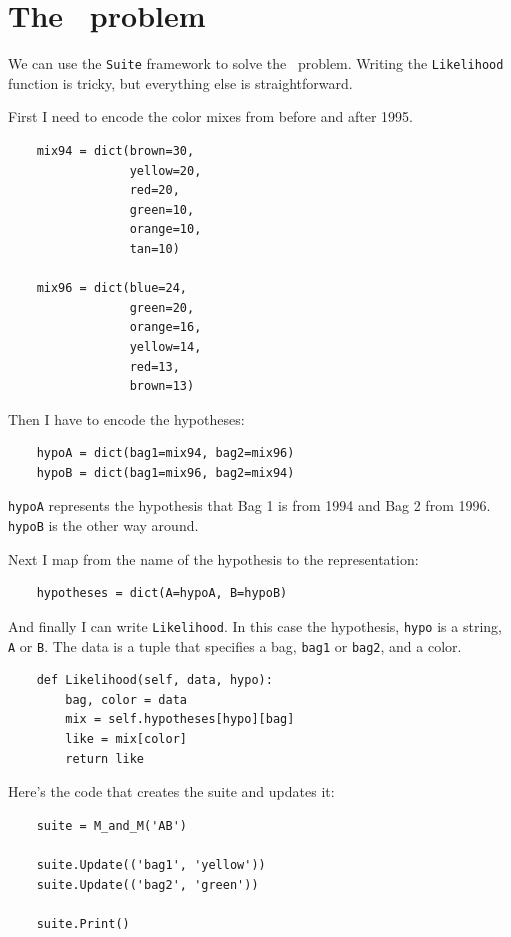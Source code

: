 \documentclass[12pt]{book}
\begin{document}
\section{The \MM~problem}


We can use the \verb"Suite" framework to solve the \MM~problem.
Writing the \verb"Likelihood" function is tricky, but everything
else is straightforward.

First I need to encode the color mixes from before and
after 1995.

\begin{verbatim}
    mix94 = dict(brown=30,
                 yellow=20,
                 red=20,
                 green=10,
                 orange=10,
                 tan=10)

    mix96 = dict(blue=24,
                 green=20,
                 orange=16,
                 yellow=14,
                 red=13,
                 brown=13)
\end{verbatim}

Then I have to encode the hypotheses:

\begin{verbatim}
    hypoA = dict(bag1=mix94, bag2=mix96)
    hypoB = dict(bag1=mix96, bag2=mix94)
\end{verbatim}

\verb"hypoA" represents the hypothesis that Bag 1 is from
1994 and Bag 2 from 1996.  \verb"hypoB" is the other way
around.

Next I map from the name of the hypothesis to the representation:

\begin{verbatim}
    hypotheses = dict(A=hypoA, B=hypoB)
\end{verbatim}

And finally I can write \verb"Likelihood".  In this case
the hypothesis, \verb"hypo" is a string, \verb"A" or \verb"B".
The data is a tuple that specifies a bag, \verb"bag1" or \verb"bag2",
and a color.

\begin{verbatim}
    def Likelihood(self, data, hypo):
        bag, color = data
        mix = self.hypotheses[hypo][bag]
        like = mix[color]
        return like
\end{verbatim}

Here's the code that creates the suite and updates it:

\begin{verbatim}
    suite = M_and_M('AB')

    suite.Update(('bag1', 'yellow'))
    suite.Update(('bag2', 'green'))

    suite.Print()
\end{verbatim}
\end{document}
